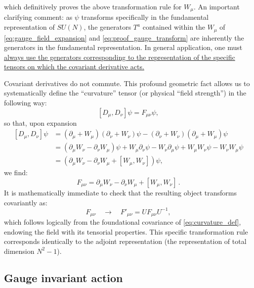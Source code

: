 which definitively proves the above transformation rule for \(W_\mu\). An important clarifying comment: as \(\psi\) transforms specifically in the fundamental representation of \(SU(N)\), the generators \(T^a\) contained within the \(W_\mu\) of \eqref{eq:gauge_field_expansion} and \eqref{eq:proof_gauge_transform} are inherently the generators in the fundamental representation. In general application, one must \uline{always use the generators corresponding to the representation of the specific tensors on which the covariant derivative acts.}

Covariant derivatives do not commute. This profound geometric fact allows us to systematically define the ``curvature'' tensor (or physical ``field strength'') in the following way:
\begin{equation} \label{eq:curvature_def}
    [D_\mu, D_\nu]\psi = F_{\mu\nu}\psi,
\end{equation}
so that, upon expansion
\[
    \begin{aligned}
        [D_\mu, D_\nu]\psi & = (\partial_\mu + W_\mu)(\partial_\nu + W_\nu)\psi - (\partial_\nu + W_\nu)(\partial_\mu + W_\mu)\psi                               \\
                           & = (\partial_\mu W_\nu - \partial_\nu W_\mu)\psi + W_\mu\partial_\nu\psi - W_\nu\partial_\mu\psi + W_\mu W_\nu\psi - W_\nu W_\mu\psi \\
                           & = (\partial_\mu W_\nu - \partial_\nu W_\mu + [W_\mu, W_\nu])\psi,
    \end{aligned}
\]
we find:
\begin{equation} \label{eq:field_strength_tensor}
    F_{\mu\nu} = \partial_\mu W_\nu - \partial_\nu W_\mu + [W_\mu, W_\nu] \, .
\end{equation}
It is mathematically immediate to check that the resulting object transforms covariantly as:
\begin{equation} \label{eq:field_strength_transform}
    F_{\mu\nu} \quad \rightarrow \quad F'_{\mu\nu} = U F_{\mu\nu} U^{-1},
\end{equation}
which follows logically from the foundational covariance of \eqref{eq:curvature_def}, endowing the field with its tensorial properties. This specific transformation rule corresponds identically to the adjoint representation (the representation of total dimension \(N^2 - 1\)).

\subsection{Gauge invariant action}

